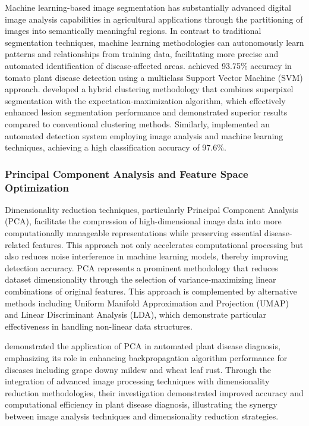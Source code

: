 \documentclass[sn-mathphys]{sn-jnl}
\theoremstyle{thmstyleone}%
\theoremstyle{thmstyletwo}%
\theoremstyle{thmstylethree}%
\begin{document}
Machine learning-based image segmentation has substantially advanced digital image analysis capabilities in agricultural applications through the partitioning of images into semantically meaningful regions. In contrast to traditional segmentation techniques, machine learning methodologies can autonomously learn patterns and relationships from training data, facilitating more precise and automated identification of disease-affected areas. \citet{vetal2017tomato} achieved 93.75\% accuracy in tomato plant disease detection using a multiclass Support Vector Machine (SVM) approach. \citet{zhang2019plant} developed a hybrid clustering methodology that combines superpixel segmentation with the expectation-maximization algorithm, which effectively enhanced lesion segmentation performance and demonstrated superior results compared to conventional clustering methods. Similarly, \citet{singh2019plant} implemented an automated detection system employing image analysis and machine learning techniques, achieving a high classification accuracy of 97.6\%.


\subsubsection{Principal Component Analysis and Feature Space Optimization}

Dimensionality reduction techniques, particularly Principal Component Analysis (PCA), facilitate the compression of high-dimensional image data into more computationally manageable representations while preserving essential disease-related features. This approach not only accelerates computational processing but also reduces noise interference in machine learning models, thereby improving detection accuracy. PCA represents a prominent methodology that reduces dataset dimensionality through the selection of variance-maximizing linear combinations of original features. This approach is complemented by alternative methods including Uniform Manifold Approximation and Projection (UMAP) and Linear Discriminant Analysis (LDA), which demonstrate particular effectiveness in handling non-linear data structures.

\citet{wang2012image} demonstrated the application of PCA in automated plant disease diagnosis, emphasizing its role in enhancing backpropagation algorithm performance for diseases including grape downy mildew and wheat leaf rust. Through the integration of advanced image processing techniques with dimensionality reduction methodologies, their investigation demonstrated improved accuracy and computational efficiency in plant disease diagnosis, illustrating the synergy between image analysis techniques and dimensionality reduction strategies.
\end{document}
